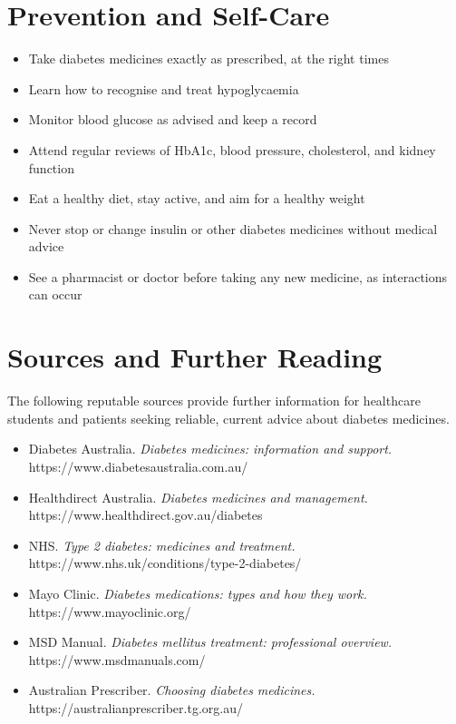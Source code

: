 \section*{Prevention and Self-Care}
\begin{itemize}
    \item Take diabetes medicines exactly as prescribed, at the right times
    \item Learn how to recognise and treat hypoglycaemia
    \item Monitor blood glucose as advised and keep a record
    \item Attend regular reviews of HbA1c, blood pressure, cholesterol, and kidney function
    \item Eat a healthy diet, stay active, and aim for a healthy weight
    \item Never stop or change insulin or other diabetes medicines without medical advice
    \item See a pharmacist or doctor before taking any new medicine, as interactions can occur
\end{itemize}

\section*{Sources and Further Reading}
The following reputable sources provide further information for healthcare students and patients seeking reliable, current advice about diabetes medicines.

\begin{itemize}
    \item Diabetes Australia. \textit{Diabetes medicines: information and support.} https://www.diabetesaustralia.com.au/
    \item Healthdirect Australia. \textit{Diabetes medicines and management.} https://www.healthdirect.gov.au/diabetes
    \item NHS. \textit{Type 2 diabetes: medicines and treatment.} https://www.nhs.uk/conditions/type-2-diabetes/
    \item Mayo Clinic. \textit{Diabetes medications: types and how they work.} https://www.mayoclinic.org/
    \item MSD Manual. \textit{Diabetes mellitus treatment: professional overview.} https://www.msdmanuals.com/
    \item Australian Prescriber. \textit{Choosing diabetes medicines.} https://australianprescriber.tg.org.au/
\end{itemize}
